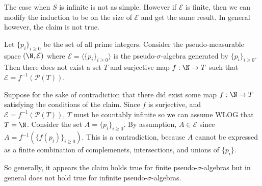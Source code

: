 \documentclass[11pt,letterpaper]{article}
\begin{document}
The case when $S$ is infinite is not as simple. However if $\mathcal{E}$ is finite, then we can modify the induction to be on the size of $\mathcal{E}$ and get the same result. In general however, the claim is not true. 

\begin{counterexample}
    Let $\{p_i\}_{i\geq 0}$ be the set of all prime integers. Consider the pseudo-measurable space $(\N, \mathcal{E})$ where $\mathcal{E} = \langle \{p_i\}_{i\geq 0}\rangle$ is the pseudo-$\sigma$-algebra generated by $\{p_i\}_{i\geq 0}$. Then there does not exist a set $T$ and surjective map $f : \N \to T$ such that $\mathcal{E} = f^{-1}(\mathcal{P}(T))$.   
\end{counterexample}
\begin{cproof}
    Suppose for the sake of contradiction that there did exist some map $f : \N \to T$ satisfying the conditions of the claim. Since $f$ is surjective, and $\mathcal{E}=f^{-1}(\mathcal{P}(T))$, $T$ must be countably infinite so we can assume WLOG that $T=\N$. Consider the set $A=\{p_i\}_{i\geq 0}$. By assumption, $A\in \mathcal{E}$ since $A=f^{-1}\left(\{f(p_i)\}_{i\geq 0}\right)$. This is a contradiction, because $A$ cannot be expressed as a finite combination of complemenets, intersections, and unions of $\{p_i\}$.
\end{cproof}

So generally, it appears the claim holds true for finite pseudo-$\sigma$-algebras but in general does not hold true for infinite pseudo-$\sigma$-algebras.
\end{document}
